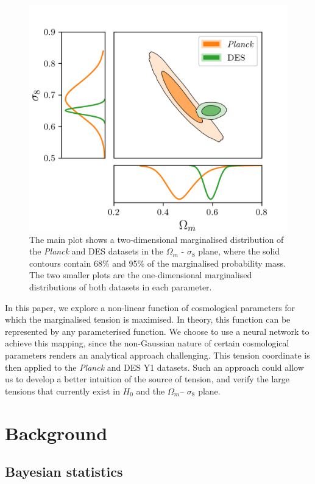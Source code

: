 \documentclass[%
 reprint,
 amsmath,amssymb,
 aps,
]{revtex4-2}
\begin{document}
\begin{figure}
    \includegraphics[width=0.9\columnwidth]{../plots/omegam_sigma8.png}
    \centering
    \caption{The main plot shows a two-dimensional marginalised distribution of the \textit{Planck} and DES datasets in the $\Omega_m$ - $\sigma_8$ plane, where the solid contours contain 68\% and 95\% of the marginalised probability mass. The two smaller plots are the one-dimensional marginalised distributions of both datasets in each   parameter.}
    \label{omegam_sigma8}
\end{figure}

In this paper, we explore a non-linear function of cosmological parameters for which the marginalised tension is maximised. In theory, this function can be represented by any parameterised function. We choose to use a neural network to achieve this mapping, since the non-Gaussian nature of certain cosmological parameters renders an analytical approach challenging. This tension coordinate is then applied to the \textit{Planck} and DES Y1 datasets. Such an approach could allow us to develop a better intuition of the source of tension, and verify the large tensions that currently exist in $H_0$ and the $\Omega_m$-- $\sigma_8$ plane.



\section{Background}

\subsection{Bayesian statistics}
\end{document}
